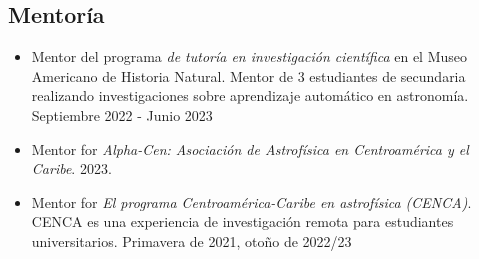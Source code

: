 \documentclass[letterpaper,10pt]{article}
\begin{document}
  \subsection*{Mentor\'ia}

  
  \begin{itemize}[label=$\blacktriangleright$]
  
  \item Mentor del programa \emph{de tutor\'ia en investigaci\'on cient\'ifica} en el Museo Americano de Historia Natural. Mentor de 3 estudiantes de secundaria realizando investigaciones sobre aprendizaje autom\'atico en astronom\'ia. Septiembre 2022 - Junio 2023

          \item Mentor for \emph{Alpha-Cen: Asociaci\'on de Astrof\'isica en Centroam\'erica y el Caribe}. 2023.

   \item Mentor for \emph{El programa Centroam\'erica-Caribe en astrof\'isica (CENCA)}. CENCA es una experiencia de investigaci\'on remota para estudiantes universitarios. Primavera de 2021, oto\~{n}o de 2022/23
\end{itemize}
  
  \begin{comment}
  
\begin{itemize}[label=$\blacktriangleright$]

	\item \emph{Graduate Part-Time Instructor} PHYS 1403/1404: Algebra-based, Inquiry-based, Laboratory-based Introductory Physics Curriculum. TTU, 2017-Present.  
	
	

	
\item \emph{Teaching Assistant.}  PHYS 1401/2401: Principles of Physics I/II. Lead the laboratories and discussions for the calculus based introductory physics. TTU, 2016-2017.  
  	  

  \item \emph{Undergraduate Teaching Fellow.}  PHYS 2215: Physics for Scientists and Engineers Lab I -  Utah State, Fall 2013.
  
  
  
  
 
  
  
  \end{itemize}
  
  
  
  
  
  
  
  
  




\end{comment}
\end{document}
